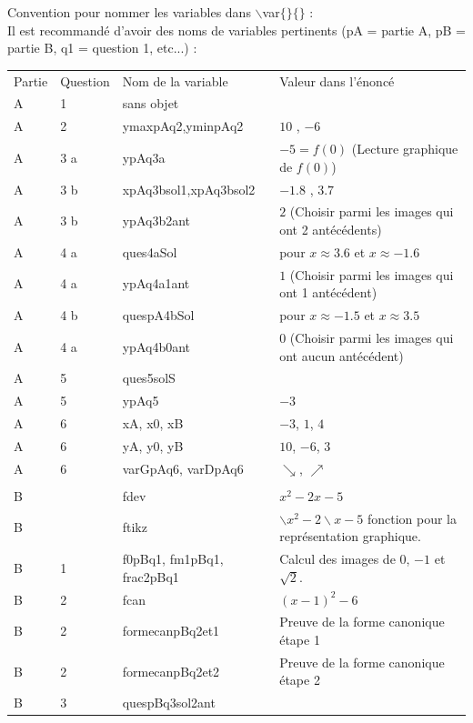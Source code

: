 {\begin{description}
\end{description}

\begin{remarque}
 Convention pour nommer les variables dans $\backslash$var$\{\}\{\}$ : \\
 Il est recommandé d'avoir des noms de variables pertinents (pA = partie A, pB = partie B, q1 = question 1, etc...)  : 
 \begin{center}
\begin{tabular}{llll}
Partie & Question & Nom de la variable & Valeur dans l'énoncé\\
A & 1 & sans objet & \\
A & 2 & ymaxpAq2,yminpAq2 & $10$ , $-6$\\
A & 3 a & ypAq3a & $-5 = f(0)$ (Lecture graphique de $f(0)$)\\
A & 3 b & xpAq3bsol1,xpAq3bsol2 & $−1.8$ , $3.7$\\
A & 3 b & ypAq3b2ant & $2$ (Choisir parmi les images qui ont 2 antécédents)\\
A & 4 a & ques4aSol & pour $x \approx 3.6$ et $x \approx −1.6$\\
A & 4 a & ypAq4a1ant & $1$ (Choisir parmi les images qui ont 1 antécédent)\\
A & 4 b & quespA4bSol & pour $x \approx -1.5$ et $x \approx 3.5$\\
A & 4 a & ypAq4b0ant & $0$ (Choisir parmi les images qui ont aucun antécédent)\\
A & 5 & ques5solS & \\
A & 5 & ypAq5 & $-3$\\
A & 6 & xA, x0, xB & $-3$, $1$, $4$\\
A & 6 & yA, y0, yB & $10$, $-6$, $3$\\
A & 6 & varGpAq6,  varDpAq6 & $\searrow$, $\nearrow$\\
 &  &  & \\
B&   & fdev & $ x^2-2x-5$\\
B&   & ftikz & $ \backslash x^2-2\backslash x-5$ fonction pour la représentation graphique. \\
B & 1 & f0pBq1, fm1pBq1, frac2pBq1 & Calcul des images de $0$, $-1$ et $\sqrt{2}$.\\
B & 2 & fcan & $(x-1)^2 -6 $\\
B & 2 & formecanpBq2et1 & Preuve de la forme canonique étape 1\\
B & 2 & formecanpBq2et2 & Preuve de la forme canonique étape 2\\
B & 3 & quespBq3sol2ant & \\

\end{tabular}
\end{center}
\end{remarque}}
